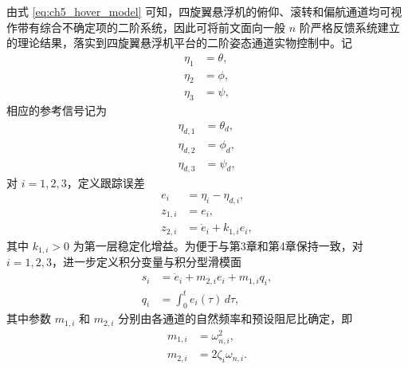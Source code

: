由式 \eqref{eq:ch5_hover_model} 可知，四旋翼悬浮机的俯仰、滚转和偏航通道均可视作带有综合不确定项的二阶系统，因此可将前文面向一般 $n$ 阶严格反馈系统建立的理论结果，落实到四旋翼悬浮机平台的二阶姿态通道实物控制中。记
\begin{subequations}
\begin{align}
\eta_1&=\theta,\\
\eta_2&=\phi,\\
\eta_3&=\psi,
\end{align}
\end{subequations}
相应的参考信号记为
\begin{subequations}
\begin{align}
\eta_{d,1}&=\theta_d,\\
\eta_{d,2}&=\phi_d,\\
\eta_{d,3}&=\psi_d,
\end{align}
\end{subequations}
对 $i=1,2,3$，定义跟踪误差
\begin{subequations}
\begin{align}
e_i&=\eta_i-\eta_{d,i},\\
z_{1,i}&=e_i,\\
z_{2,i}&=\dot e_i+k_{1,i}e_i,
\end{align}
\end{subequations}
其中 $k_{1,i}>0$ 为第一层稳定化增益。为便于与第3章和第4章保持一致，对 $i=1,2,3$，进一步定义积分变量与积分型滑模面
\begin{subequations}\label{eq:ch5_sliding_surface}
\begin{align}
s_i&=\dot e_i+m_{2,i}e_i+m_{1,i}q_i,\\
q_i&=\int_0^t e_i(\tau)\,d\tau,
\end{align}
\end{subequations}
其中参数 $m_{1,i}$ 和 $m_{2,i}$ 分别由各通道的自然频率和预设阻尼比确定，即
\begin{subequations}
\begin{align}
m_{1,i}&=\omega_{n,i}^2,\\
m_{2,i}&=2\zeta_i\omega_{n,i}.
\end{align}
\end{subequations}

